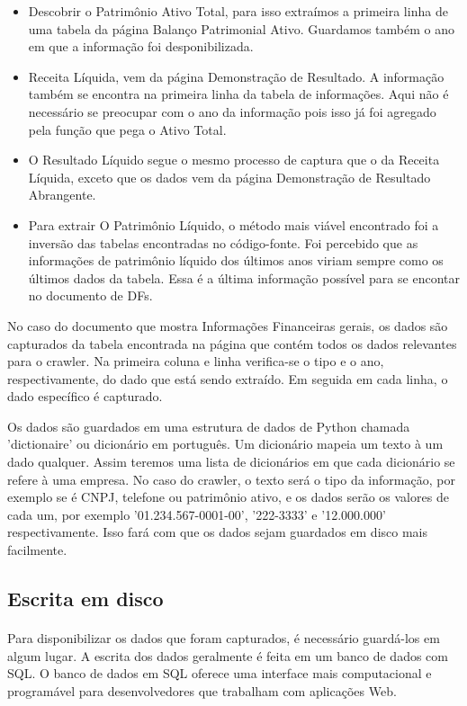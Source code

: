 \documentclass[a4paper, 12pt]{article}
\begin{document}
\begin{itemize}
\item Descobrir o Patrimônio Ativo Total, para isso extraímos a
  primeira linha de uma tabela da página Balanço Patrimonial
  Ativo. Guardamos também o ano em que a informação foi
  desponibilizada.
\item Receita Líquida, vem da página Demonstração de Resultado. A
  informação também se encontra na primeira linha da tabela de
  informações. Aqui não é necessário se preocupar com o
  ano da informação pois isso já foi agregado pela função que pega o
  Ativo Total.
\item O Resultado Líquido segue o mesmo processo de captura que o da
  Receita Líquida, exceto que os dados vem da página Demonstração de
  Resultado Abrangente.
\item Para extrair O Patrimônio Líquido, o método mais viável
  encontrado foi a inversão das tabelas encontradas no
  código-fonte. Foi percebido que as informações de patrimônio líquido
  dos últimos anos viriam sempre como os últimos dados da tabela. Essa
  é a última informação possível para se encontar no documento de DFs.
\end{itemize}

No caso do documento que mostra Informações Financeiras gerais, os
dados são capturados da tabela encontrada na página que contém todos
os dados relevantes para o crawler. Na primeira coluna e linha
verifica-se o tipo e o ano, respectivamente, do dado que está sendo
extraído. Em seguida em cada linha, o dado específico é capturado.

Os dados são guardados em uma estrutura de dados de Python chamada
'dictionaire'\label{dic} ou dicionário em português. Um dicionário mapeia um
texto à um dado qualquer. Assim teremos uma lista de dicionários em
que cada dicionário se refere à uma empresa. No caso do crawler, o
texto será o tipo da
informação, por exemplo se é CNPJ, telefone ou patrimônio ativo, e os
dados serão os valores de cada um, por exemplo '01.234.567-0001-00',
'222-3333' e '12.000.000' respectivamente. Isso fará com que os dados
sejam guardados em disco mais facilmente.

\subsection{Escrita em disco}\label{escrita}
\paragraph{}Para disponibilizar os dados que foram capturados, é
necessário guardá-los em algum lugar. A escrita dos dados geralmente é
feita em um banco de dados com SQL. O banco de dados em SQL oferece
uma interface mais computacional e programável para desenvolvedores
que trabalham com aplicações Web.
\end{document}
